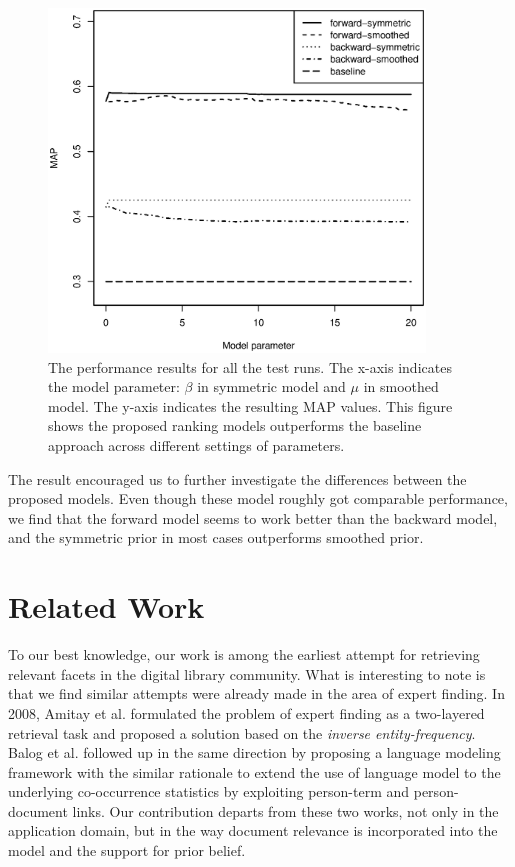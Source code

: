 \begin{figure}[ht!]
  \centering
  \includegraphics[width=10cm]{performance.eps}
  \caption{The performance results for all the test runs.  The x-axis indicates
  the model parameter: $\beta$ in symmetric model and $\mu$ in smoothed model.
  The y-axis indicates the resulting MAP values.  This figure shows the
  proposed ranking models outperforms the baseline approach across different
  settings of parameters.} \label{f:performance}
\end{figure}

The result encouraged us to further investigate the differences between the
proposed models.  Even though these model roughly got comparable performance, we
find that the forward model seems to work better than the backward model, and
the symmetric prior in most cases outperforms smoothed prior. 

\section{Related Work}\label{s:related-work}


To our best knowledge, our work is among the earliest attempt for retrieving
relevant facets in the digital library community.  What is interesting to note
is that we find similar attempts were already made in the area of expert
finding.  In 2008, Amitay et al. \cite{amitay2008finding} formulated the
problem of expert finding as a two-layered retrieval task and proposed a
solution based on the \emph{inverse entity-frequency}.  Balog et al.
\cite{balog2009language} followed up in the same direction by proposing a
language modeling framework with the similar rationale to extend the use of
language model to the underlying co-occurrence statistics by exploiting
person-term and person-document links.  Our contribution departs from these two
works, not only in the application domain, but in the way document relevance is
incorporated into the model and the support for prior belief.  
 
